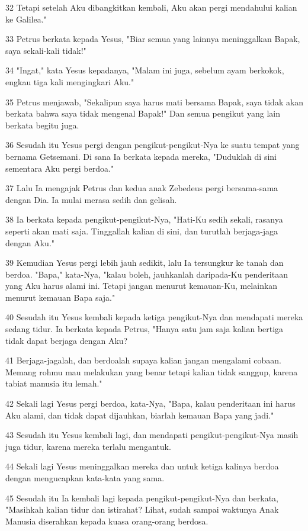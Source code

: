 \par 32 Tetapi setelah Aku dibangkitkan kembali, Aku akan pergi mendahului kalian ke Galilea."
\par 33 Petrus berkata kepada Yesus, "Biar semua yang lainnya meninggalkan Bapak, saya sekali-kali tidak!"
\par 34 "Ingat," kata Yesus kepadanya, "Malam ini juga, sebelum ayam berkokok, engkau tiga kali mengingkari Aku."
\par 35 Petrus menjawab, "Sekalipun saya harus mati bersama Bapak, saya tidak akan berkata bahwa saya tidak mengenal Bapak!" Dan semua pengikut yang lain berkata begitu juga.
\par 36 Sesudah itu Yesus pergi dengan pengikut-pengikut-Nya ke suatu tempat yang bernama Getsemani. Di sana Ia berkata kepada mereka, "Duduklah di sini sementara Aku pergi berdoa."
\par 37 Lalu Ia mengajak Petrus dan kedua anak Zebedeus pergi bersama-sama dengan Dia. Ia mulai merasa sedih dan gelisah.
\par 38 Ia berkata kepada pengikut-pengikut-Nya, "Hati-Ku sedih sekali, rasanya seperti akan mati saja. Tinggallah kalian di sini, dan turutlah berjaga-jaga dengan Aku."
\par 39 Kemudian Yesus pergi lebih jauh sedikit, lalu Ia tersungkur ke tanah dan berdoa. "Bapa," kata-Nya, "kalau boleh, jauhkanlah daripada-Ku penderitaan yang Aku harus alami ini. Tetapi jangan menurut kemauan-Ku, melainkan menurut kemauan Bapa saja."
\par 40 Sesudah itu Yesus kembali kepada ketiga pengikut-Nya dan mendapati mereka sedang tidur. Ia berkata kepada Petrus, "Hanya satu jam saja kalian bertiga tidak dapat berjaga dengan Aku?
\par 41 Berjaga-jagalah, dan berdoalah supaya kalian jangan mengalami cobaan. Memang rohmu mau melakukan yang benar tetapi kalian tidak sanggup, karena tabiat manusia itu lemah."
\par 42 Sekali lagi Yesus pergi berdoa, kata-Nya, "Bapa, kalau penderitaan ini harus Aku alami, dan tidak dapat dijauhkan, biarlah kemauan Bapa yang jadi."
\par 43 Sesudah itu Yesus kembali lagi, dan mendapati pengikut-pengikut-Nya masih juga tidur, karena mereka terlalu mengantuk.
\par 44 Sekali lagi Yesus meninggalkan mereka dan untuk ketiga kalinya berdoa dengan mengucapkan kata-kata yang sama.
\par 45 Sesudah itu Ia kembali lagi kepada pengikut-pengikut-Nya dan berkata, "Masihkah kalian tidur dan istirahat? Lihat, sudah sampai waktunya Anak Manusia diserahkan kepada kuasa orang-orang berdosa.
